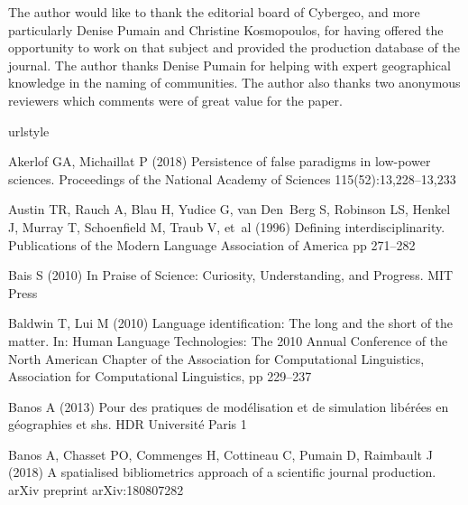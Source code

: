 \documentclass[10pt]{article}
\begin{document}
The author would like to thank the editorial board of Cybergeo, and more particularly Denise Pumain and Christine Kosmopoulos, for having offered the opportunity to work on that subject and provided the production database of the journal. The author thanks Denise Pumain for helping with expert geographical knowledge in the naming of communities. The author also thanks two anonymous reviewers which comments were of great value for the paper.



\begin{thebibliography}{84}
\providecommand{\natexlab}[1]{#1}
\providecommand{\url}[1]{{#1}}
\providecommand{\urlprefix}{URL }
\expandafter\ifx\csname urlstyle\endcsname\relax
  \providecommand{\doi}[1]{DOI~\discretionary{}{}{}#1}\else
  \providecommand{\doi}{DOI~\discretionary{}{}{}\begingroup
  \urlstyle{rm}\Url}\fi
\providecommand{\eprint}[2][]{\url{#2}}

Akerlof GA, Michaillat P (2018) Persistence of false paradigms in low-power
  sciences. Proceedings of the National Academy of Sciences
  115(52):13,228--13,233

Austin TR, Rauch A, Blau H, Yudice G, van Den~Berg S, Robinson LS, Henkel J,
  Murray T, Schoenfield M, Traub V, et~al (1996) Defining interdisciplinarity.
  Publications of the Modern Language Association of America pp 271--282

Bais S (2010) In Praise of Science: Curiosity, Understanding, and Progress. MIT
  Press

Baldwin T, Lui M (2010) Language identification: The long and the short of the
  matter. In: Human Language Technologies: The 2010 Annual Conference of the
  North American Chapter of the Association for Computational Linguistics,
  Association for Computational Linguistics, pp 229--237

Banos A (2013) Pour des pratiques de mod{\'e}lisation et de simulation
  lib{\'e}r{\'e}es en g{\'e}ographies et shs. HDR Universit{\'e} Paris 1

Banos A, Chasset PO, Commenges H, Cottineau C, Pumain D, Raimbault J (2018) A
  spatialised bibliometrics approach of a scientific journal production. arXiv
  preprint arXiv:180807282


\end{thebibliography}
\end{document}
